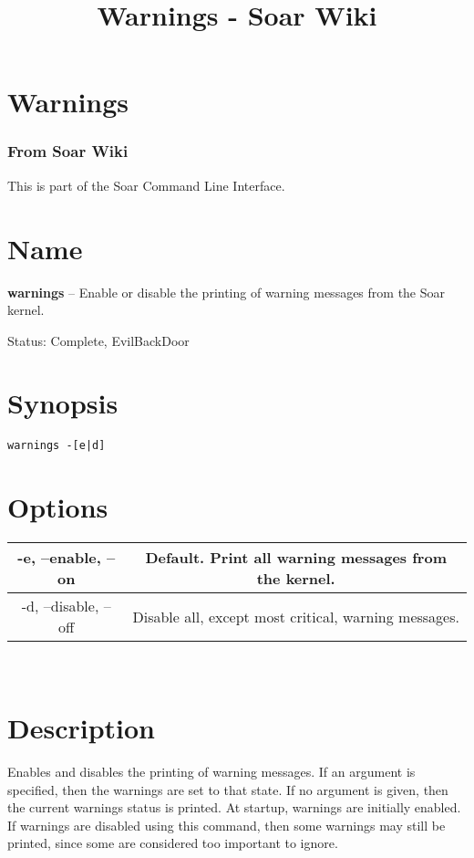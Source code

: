 \documentclass[10pt]{article}
\title{Warnings - Soar Wiki}
\begin{document}
\section*{Warnings}
\subsubsection*{From Soar Wiki}


 This is part of the Soar Command Line Interface. 
\section*{ Name }


 \textbf{warnings}
 -- Enable or disable the printing of warning messages from the Soar kernel. 


 Status: Complete, EvilBackDoor
\section*{ Synopsis }
\begin{verbatim}
warnings -[e|d]

\end{verbatim}
\section*{ Options }


\begin{tabular}{|c|c|}
\hline 
 -e, --enable, --on  & Default. Print all warning messages from the kernel.  \\
 \hline 
 -d, --disable, --off  & Disable all, except most critical, warning messages.  \\
 \hline 

\end{tabular}



 \\ 

\section*{ Description }


 Enables and disables the printing of warning messages. If an argument is specified, then the warnings are set to that state. If no argument is given, then the current warnings status is printed. At startup, warnings are initially enabled. If warnings are disabled using this command, then some warnings may still be printed, since some are considered too important to ignore. 
\end{document}

